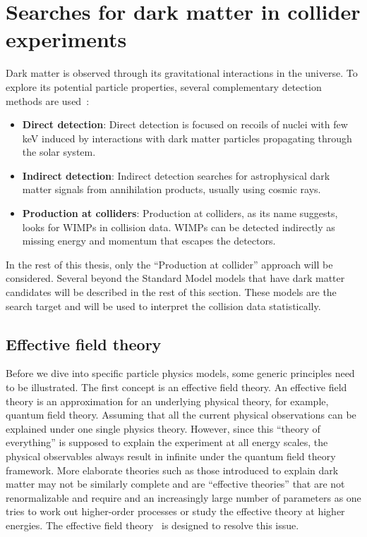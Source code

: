 \section{Searches for dark matter in collider experiments}
\label{sec:dms3}
\par Dark matter is observed through its gravitational interactions in the universe. To explore its potential particle properties, several complementary detection methods are used~\cite{Undagoitia:2015gya}: 
\begin{itemize}
  \item \textbf{Direct detection}: Direct detection is focused on recoils of nuclei with few keV induced by interactions with dark matter particles propagating through the solar system.
  \item \textbf{Indirect detection}: Indirect detection searches for astrophysical dark matter signals from annihilation products, usually using cosmic rays.
  \item \textbf{Production at colliders}: Production at colliders, as its name suggests, looks for WIMPs in collision data. WIMPs can be detected indirectly as missing energy and momentum that escapes the detectors.
\end{itemize}

\par In the rest of this thesis, only the ``Production at collider'' approach will be considered. Several beyond the Standard Model models that have dark matter candidates will be described in the rest of this section. These models are the search target and will be used to interpret the collision data statistically.

\subsection{Effective field theory}
Before we dive into specific particle physics models, some generic principles need to be illustrated. The first concept is an effective field theory. An effective field theory is an approximation for an underlying physical theory, for example, quantum field theory. Assuming that all the current physical observations can be explained under one single physics theory. However, since this “theory of everything” is supposed to explain the experiment at all energy scales, the physical observables always result in infinite under the quantum field theory framework. More elaborate theories such as those introduced to explain dark matter
may not be similarly complete and are “effective
theories” that are not renormalizable and require
and an increasingly large number of parameters as
one tries to work out higher-order processes or
study the effective theory at higher energies. The effective field theory~\cite{Pich:1998xt} is designed to resolve this issue.

